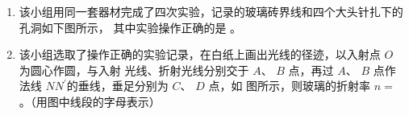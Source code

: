 \begin{enumerate}
\begin{enumerate}
\item 
该小组用同一套器材完成了四次实验，记录的玻璃砖界线和四个大头针扎下的孔洞如下图所示，
其中实验操作正确的是 \underlinegap 。
\pfourchoices
{}
{}
{}
{}


\item 
该小组选取了操作正确的实验记录，在白纸上画出光线的径迹，以入射点 $ O $ 为圆心作圆，与入射
光线、折射光线分别交于 $ A $、 $ B $ 点，再过 $ A $、 $ B $ 点作法线 $ NN^{\prime} $的垂线，垂足分别为 $ C $、 $ D $ 点，如
图所示，则玻璃的折射率 $ n= $ \underlinegap 。（用图中线段的字母表示）
\begin{figure}[h!]
	\centering
	
\end{figure}

\end{enumerate}





	
\end{enumerate}

